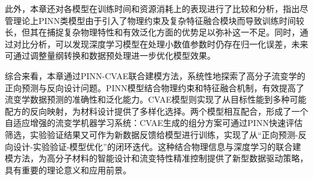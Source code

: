 此外，本章还对各模型在训练时间和资源消耗上的表现进行了比较和分析，指出尽管理论上PINN类模型由于引入了物理约束及复杂特征融合模块而导致训练时间较长，但其在捕捉复杂物理特性和有效泛化方面的优势足以弥补这一不足。同时，通过对比分析，可以发现深度学习模型在处理小数值参数时仍存在归一化误差，未来可通过调整量纲转换和数据预处理进一步优化模型效果。

综合来看，本章通过PINN-CVAE联合建模方法，系统性地探索了高分子流变学的正向预测与反向设计问题。PINN模型结合物理约束和特征融合机制，有效提高了流变学数据预测的准确性和泛化能力。CVAE模型则实现了从目标性能到多种可能配方的反向映射，为材料设计提供了多样化选择。两个模型相互配合，形成了一个自适应增强的流变学机器学习系统：CVAE生成的组分方案可通过PINN快速评估筛选，实验验证结果又可作为新数据反馈给模型进行训练，实现了从“正向预测-反向设计-实验验证-模型优化”的闭环迭代。这种结合物理信息与深度学习的联合建模方法，为高分子材料的智能设计和流变特性精准控制提供了新型数据驱动策略，具有重要的理论意义和应用前景。
